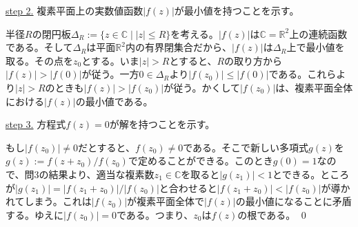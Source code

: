 \noindent \underline{step 2.} 複素平面上の実数値函数$|f(z)|$が最小値を持つことを示す。

半径$R$の閉円板$\Delta_R:=\{z\in\mathbb{C}\mid |z|\leq R\}$を考える。$|f(z)|$は$\mathbb{C}=\mathbb{R}^2$上の連続函数である。そして$\Delta_R$は平面$\mathbb{R}^2$内の有界閉集合だから、$|f(z)|$は$\Delta_R$上で最小値を取る。その点を$z_0$とする。いま$|z|>R$とすると、$R$の取り方から$|f(z)|>|f(0)|$が従う。一方$0\in\Delta_R$より$|f(z_0)|\leq |f(0)|$である。これらより$|z|>R$のときも$|f(z)|>|f(z_0)|$が従う。かくして$|f(z_0)|$は、複素平面全体における$|f(z)|$の最小値である。

\noindent \underline{step 3.} 方程式$f(z)=0$が解を持つことを示す。

もし$|f(z_0)|\neq 0$だとすると、$f(z_0)\neq 0$である。そこで新しい多項式$g(z)$を$g(z):=f(z+z_0)/f(z_0)$で定めることができる。このとき$g(0)=1$なので、問3の結果より、適当な複素数$z_1\in\mathbb{C}$を取ると$|g(z_1)|<1$とできる。ところが$|g(z_1)| = |f(z_1+z_0)| / |f(z_0)|$と合わせると$|f(z_1+z_0)| < |f(z_0)|$が導かれてしまう。これは$|f(z_0)|$が複素平面全体で$|f(z)|$の最小値になることに矛盾する。ゆえに$|f(z_0)|=0$である。つまり、$z_0$は$f(z)$の根である。 \qed

